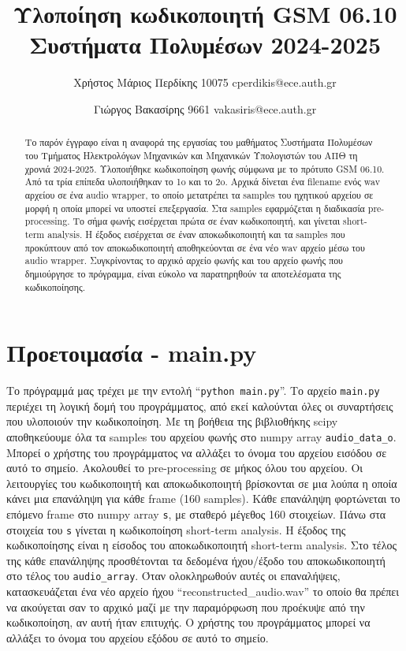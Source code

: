 \documentclass{article}
\title{Υλοποίηση κωδικοποιητή GSM 06.10 Συστήματα Πολυμέσων 2024-2025}
\author{Χρήστος Μάριος Περδίκης 10075 cperdikis@ece.auth.gr 
\and Γιώργος Βακασίρης 9661 vakasiris@ece.auth.gr}
\date{}
\begin{document}
 \maketitle 
\begin{abstract}
Το παρόν έγγραφο είναι η αναφορά της εργασίας του μαθήματος
Συστήματα Πολυμέσων του Τμήματος Ηλεκτρολόγων Μηχανικών και 
Μηχανικών Υπολογιστών του ΑΠΘ τη χρονιά 2024-2025.  Υλοποιήθηκε κωδικοποίηση
φωνής σύμφωνα με το πρότυπο GSM 06.10\@. Από τα τρία επίπεδα
υλοποιήθηκαν το 1o και το 2o.  Αρχικά δίνεται ένα filename ενός wav
αρχείου σε ένα audio wrapper, το οποίο μετατρέπει τα samples του ηχητικού
αρχείου σε μορφή η οποία μπορεί να υποστεί επεξεργασία.
Στα samples εφαρμόζεται η διαδικασία pre-processing. Το σήμα φωνής
εισέρχεται πρώτα σε έναν κωδικοποιητή, και γίνεται short-term analysis.
Η έξοδος εισέρχεται σε έναν αποκωδικοποιητή και τα samples
που προκύπτουν από τον αποκωδικοποιητή αποθηκεύονται σε
ένα νέο wav αρχείο μέσω του audio wrapper.  Συγκρίνοντας το αρχικό
αρχείο φωνής και του αρχείο φωνής που δημιούργησε το
πρόγραμμα, είναι εύκολο να παρατηρηθούν τα αποτελέσματα της
κωδικοποίησης.
\end{abstract}

\section{Προετοιμασία - main.py}
Το πρόγραμμά μας τρέχει με την εντολή ``\verb|python main.py|''.  Το αρχείο
\verb|main.py| περιέχει τη λογική δομή του προγράμματος, από εκεί
καλούνται όλες οι συναρτήσεις που υλοποιούν την κωδικοποίηση.
Με τη βοήθεια της βιβλιοθήκης scipy αποθηκεύουμε όλα τα samples του
αρχείου φωνής στο numpy array \verb|audio_data_o|. Μπορεί ο χρήστης 
του προγράμματος να αλλάξει το όνομα του αρχείου εισόδου σε αυτό το σημείο.
Ακολουθεί το pre-processing σε
μήκος όλου του αρχείου. Οι λειτουργίες του κωδικοποιητή και
αποκωδικοποιητή βρίσκονται σε μια λούπα η οποία κάνει μια
επανάληψη για κάθε frame (160 samples). Κάθε επανάληψη φορτώνεται το
επόμενο frame στο numpy array \verb|s|, με σταθερό μέγεθος 160
στοιχείων. Πάνω στα στοιχεία του \verb|s| γίνεται η κωδικοποίηση 
short-term analysis. Η έξοδος της κωδικοποίησης είναι η είσοδος
του αποκωδικοποιητή short-term analysis. Στο τέλος της κάθε 
επανάληψης προσθέτονται τα δεδομένα ήχου\slash{}έξοδο του 
αποκωδικοποιητή στο τέλος του \verb|audio_array|. Όταν ολοκληρωθούν 
αυτές οι επαναλήψεις, κατασκευάζεται ένα νέο αρχείο ήχου 
``reconstructed\_audio.wav'' το οποίο θα πρέπει να ακούγεται σαν 
το αρχικό μαζί με την παραμόρφωση που προέκυψε από την κωδικοποίηση, 
αν αυτή ήταν επιτυχής. Ο χρήστης του προγράμματος μπορεί να
αλλάξει το όνομα του αρχείου εξόδου σε αυτό το σημείο. 
\end{document}
